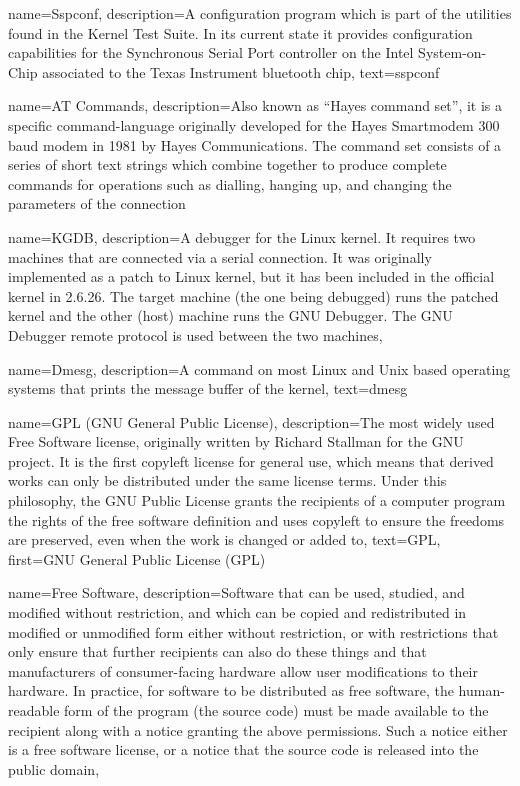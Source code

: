 {
  name=Sspconf,
  description={A configuration program which is part of the utilities
    found in the Kernel Test Suite. In its current state it provides
    configuration capabilities for the Synchronous Serial Port
    controller on the Intel System-on-Chip associated to the Texas
    Instrument bluetooth chip},
  text=sspconf
}

{
  name=AT Commands,
  description={Also known as ``Hayes command set'', it is a specific
    command-language originally developed for the Hayes Smartmodem 300
    baud modem in 1981 by Hayes Communications. The command set
    consists of a series of short text strings which combine together
    to produce complete commands for operations such as dialling,
    hanging up, and changing the parameters of the connection}
}

{
  name=KGDB,
  description={A debugger for the Linux kernel. It requires two
    machines that are connected via a serial connection. It was
    originally implemented as a patch to Linux kernel, but it has been
    included in the official kernel in 2.6.26. The target machine (the
    one being debugged) runs the patched kernel and the other (host)
    machine runs the GNU Debugger. The GNU Debugger remote protocol is
    used between the two machines},
}

{
  name=Dmesg,
  description={A command on most Linux and Unix based operating
    systems that prints the message buffer of the kernel},
  text=dmesg
}

{
  name=GPL (GNU General Public License),
  description={The most widely used Free Software license, originally
    written by Richard Stallman for the GNU project. It is the first
    copyleft license for general use, which means that derived works
    can only be distributed under the same license terms. Under this
    philosophy, the GNU Public License grants the recipients of a
    computer program the rights of the free software definition and
    uses copyleft to ensure the freedoms are preserved, even when the
    work is changed or added to},
  text=GPL,
  first=GNU General Public License (GPL)
}

{
  name=Free Software,
  description={Software that can be used, studied, and modified
    without restriction, and which can be copied and redistributed in
    modified or unmodified form either without restriction, or with
    restrictions that only ensure that further recipients can also do
    these things and that manufacturers of consumer-facing hardware
    allow user modifications to their hardware. In practice, for
    software to be distributed as free software, the human-readable
    form of the program (the source code) must be made available to
    the recipient along with a notice granting the above
    permissions. Such a notice either is a free software license, or a
    notice that the source code is released into the public domain},
}


